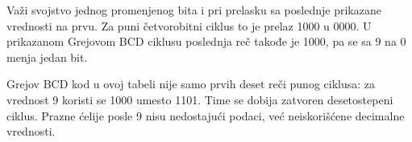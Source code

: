 Važi svojstvo jednog promenjenog bita i pri prelasku sa poslednje prikazane vrednosti na prvu. Za puni četvorobitni ciklus to je prelaz 1000 u 0000. U prikazanom Grejovom BCD ciklusu poslednja reč takođe je 1000, pa se sa 9 na 0 menja jedan bit.

Grejov BCD kod u ovoj tabeli nije samo prvih deset reči punog ciklusa: za vrednost 9 koristi se 1000 umesto 1101. Time se dobija zatvoren desetostepeni ciklus. Prazne ćelije posle 9 nisu nedostajući podaci, već neiskorišćene decimalne vrednosti.
